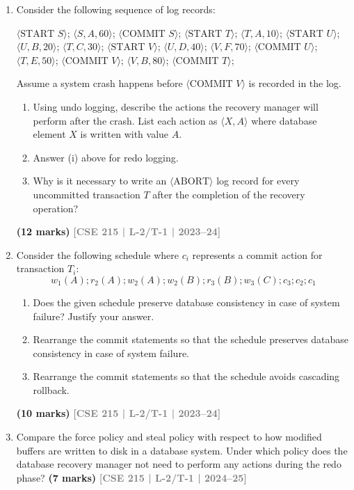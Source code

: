 \documentclass[12pt,a3paper]{article}
\newcommand{\yr}[1]{\hfill\textcolor{gray}{\small\textbf{[#1]}}}
\newcommand{\mk}[1]{\textcolor{orange!70!black}{\small\textbf{(#1 marks)}}}
\begin{document}
\begin{enumerate}
\item Consider the following sequence of log records:
\begin{center}
\small\ttfamily
$\langle\text{START } S\rangle$; $\langle S, A, 60\rangle$; $\langle\text{COMMIT } S\rangle$; $\langle\text{START } T\rangle$; $\langle T, A, 10\rangle$; $\langle\text{START } U\rangle$; $\langle U, B, 20\rangle$; $\langle T, C, 30\rangle$; $\langle\text{START } V\rangle$; $\langle U, D, 40\rangle$; $\langle V, F, 70\rangle$; $\langle\text{COMMIT } U\rangle$; $\langle T, E, 50\rangle$; $\langle\text{COMMIT } V\rangle$; $\langle V, B, 80\rangle$; $\langle\text{COMMIT } T\rangle$;
\end{center}
Assume a system crash happens before $\langle\text{COMMIT } V\rangle$ is recorded in the log.
\begin{enumerate}
  \item Using undo logging, describe the actions the recovery manager will perform after the crash. List each action as $\langle X, A\rangle$ where database element $X$ is written with value $A$.
  \item Answer (i) above for redo logging.
  \item Why is it necessary to write an $\langle\text{ABORT}\rangle$ log record for every uncommitted transaction $T$ after the completion of the recovery operation?
\end{enumerate}
\mk{12} \yr{CSE 215 | L-2/T-1 | 2023--24}

\item Consider the following schedule where $c_i$ represents a commit action for transaction $T_i$:
\[w_1(A); r_2(A); w_2(A); w_2(B); r_3(B); w_3(C); c_3; c_2; c_1\]
\begin{enumerate}
  \item Does the given schedule preserve database consistency in case of system failure? Justify your answer.
  \item Rearrange the commit statements so that the schedule preserves database consistency in case of system failure.
  \item Rearrange the commit statements so that the schedule avoids cascading rollback.
\end{enumerate}
\mk{10} \yr{CSE 215 | L-2/T-1 | 2023--24}

\item Compare the force policy and steal policy with respect to how modified buffers are written to disk in a database system. Under which policy does the database recovery manager not need to perform any actions during the redo phase?
\mk{7} \yr{CSE 215 | L-2/T-1 | 2024--25}


\end{enumerate}
\end{document}
